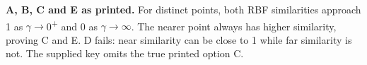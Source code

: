 \textbf{A, B, C and E as printed.} For distinct points, both RBF similarities approach 1 as \ensuremath{\gamma}\ensuremath{\to}0\textsuperscript{+} and 0 as \ensuremath{\gamma}\ensuremath{\to}\ensuremath{\infty}. The nearer point always has higher similarity, proving C and E. D fails: near similarity can be close to 1 while far similarity is not. The supplied key omits the true printed option C.

